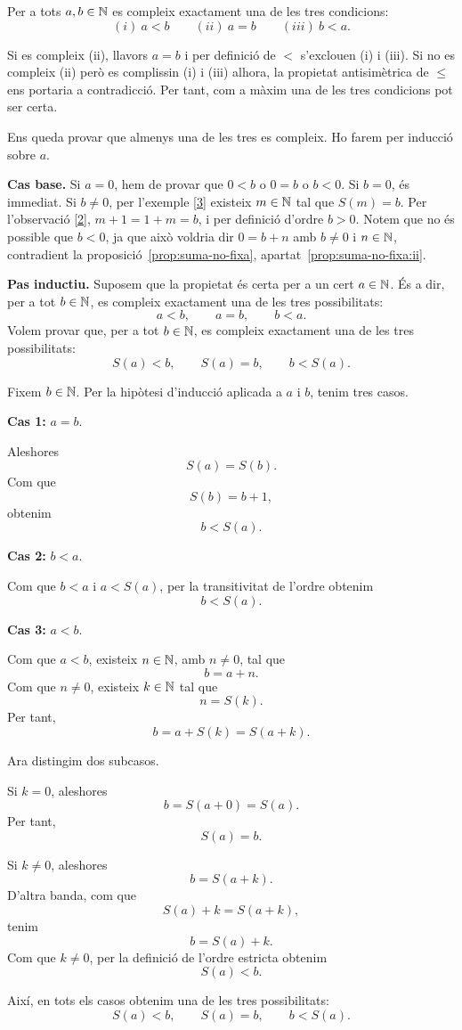 \begin{teorema}
Per a tots $a,b\in \mathbb{N}$ es compleix exactament una de les tres condicions:
\[
(i)\ a<b \qquad (ii)\ a=b \qquad (iii)\ b<a.
\]
\end{teorema}

\begin{prova}
Si es compleix (ii), llavors $a=b$ i per definició de $<$ s'exclouen (i) i (iii). Si no es compleix (ii) però es complissin (i) i (iii) alhora, la propietat antisimètrica de $\leq$ ens portaria a contradicció. Per tant, com a màxim una de les tres condicions pot ser certa.

Ens queda provar que almenys una de les tres es compleix. Ho farem per inducció sobre $a$.

\textbf{Cas base.} Si $a=0$, hem de provar que $0<b$ o $0=b$ o $b<0$. Si $b=0$, és immediat. Si $b\neq 0$, per l'exemple \ref{3} existeix $m\in \mathbb{N}$ tal que $S(m)=b$. Per l'observació \ref{2}, $m+1=1+m=b$, i per definició d'ordre $b>0$. Notem que no és possible que $b<0$, ja que això voldria dir $0=b+n$ amb $b\neq 0$ i $n \in \mathbb{N}$, contradient la proposició~\ref{prop:suma-no-fixa}, apartat~\ref{prop:suma-no-fixa:ii}.

\textbf{Pas inductiu.} Suposem que la propietat és certa per a un cert $a\in\mathbb{N}$. És a dir, per a tot $b\in\mathbb{N}$, es compleix exactament una de les tres possibilitats:
\[
a<b,\qquad a=b,\qquad b<a.
\]
Volem provar que, per a tot $b\in\mathbb{N}$, es compleix exactament una de les tres possibilitats:
\[
S(a)<b,\qquad S(a)=b,\qquad b<S(a).
\]

Fixem $b\in\mathbb{N}$. Per la hipòtesi d'inducció aplicada a $a$ i $b$, tenim tres casos.

\medskip

\noindent\textbf{Cas 1:} $a=b$.

Aleshores
\[
S(a)=S(b).
\]
Com que
\[
S(b)=b+1,
\]
obtenim
\[
b<S(a).
\]

\medskip

\noindent\textbf{Cas 2:} $b<a$.

Com que $b<a$ i $a<S(a)$, per la transitivitat de l'ordre obtenim
\[
b<S(a).
\]

\medskip

\noindent\textbf{Cas 3:} $a<b$.

Com que $a<b$, existeix $n\in\mathbb{N}$, amb $n\neq 0$, tal que
\[
b=a+n.
\]
Com que $n\neq 0$, existeix $k\in\mathbb{N}$ tal que
\[
n=S(k).
\]
Per tant,
\[
b=a+S(k)=S(a+k).
\]

Ara distingim dos subcasos.

Si $k=0$, aleshores
\[
b=S(a+0)=S(a).
\]
Per tant,
\[
S(a)=b.
\]

Si $k\neq 0$, aleshores
\[
b=S(a+k).
\]
D'altra banda, com que
\[
S(a)+k=S(a+k),
\]
tenim
\[
b=S(a)+k.
\]
Com que $k\neq 0$, per la definició de l'ordre estricta obtenim
\[
S(a)<b.
\]

Així, en tots els casos obtenim una de les tres possibilitats:
\[
S(a)<b,\qquad S(a)=b,\qquad b<S(a).
\]

\end{prova}

